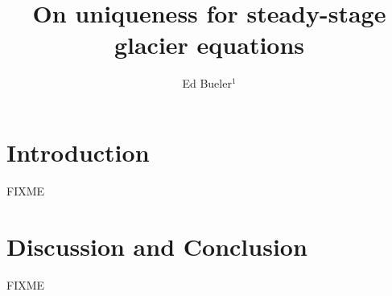 \documentclass[review,oneside]{igs}
\begin{document}
\title[On uniqueness for steady-stage glacier equations]{On uniqueness for steady-stage glacier equations}

\author[Bueler]{Ed Bueler$^1$}



\maketitle

\section{Introduction}
FIXME
\citep{LofgrenAhlkronaHelanow2022} \cite{Bodvardsson1955}

\section{Discussion and Conclusion}
FIXME


\end{document}

